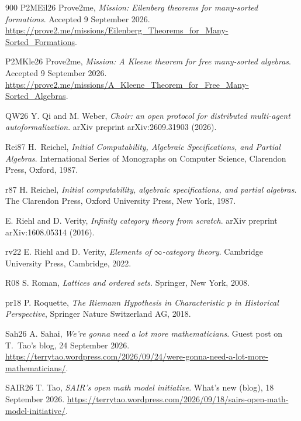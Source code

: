 \begin{thebibliography}{900}
\bibitem%
{P2MEil26} Prove2me, \emph{Mission: Eilenberg theorems for many-sorted formations}. Accepted 9 September 2026. \url{https://prove2.me/missions/Eilenberg_Theorems_for_Many-Sorted_Formations}.

\bibitem%
{P2MKle26} Prove2me, \emph{Mission: A Kleene theorem for free many-sorted algebras}. Accepted 9 September 2026. \url{https://prove2.me/missions/A_Kleene_Theorem_for_Free_Many-Sorted_Algebras}.

\bibitem%
{QW26} Y. Qi and M. Weber, \emph{Choir: an open protocol for distributed multi-agent autoformalization}. arXiv preprint arXiv:2609.31903 (2026).

\bibitem%
{Rei87} H.~Reichel, \emph{Initial Computability, Algebraic Specifications, and Partial Algebras}. International Series of Monographs on Computer Science, Clarendon Press, Oxford, 1987.

\bibitem%
{r87} H. Reichel, \emph{Initial computability, algebraic specifications, and partial algebras}. The Clarendon Press, Oxford University Press, New York, 1987.

E. Riehl and D. Verity, \emph{Infinity category theory from scratch}. arXiv preprint arXiv:1608.05314 (2016).

\bibitem%
{rv22} E. Riehl and D. Verity, \emph{Elements of $\infty$-category theory}. Cambridge University Press, Cambridge, 2022.

\bibitem%
{R08} S. Roman, \emph{Lattices and ordered sets}. Springer, New York, 2008.

\bibitem%
{pr18} P. Roquette, \emph{The Riemann Hypothesis in Characteristic $p$ in Historical Perspective}, Springer Nature Switzerland AG, 2018.



\bibitem%
{Sah26} A. Sahai, \emph{We're gonna need a lot more mathematicians}. Guest post on T.~Tao's blog, 24 September 2026. \url{https://terrytao.wordpress.com/2026/09/24/were-gonna-need-a-lot-more-mathematicians/}.

\bibitem%
{SAIR26} T. Tao, \emph{SAIR's open math model initiative}. What's new (blog), 18 September 2026. \url{https://terrytao.wordpress.com/2026/09/18/sairs-open-math-model-initiative/}.


\end{thebibliography}
